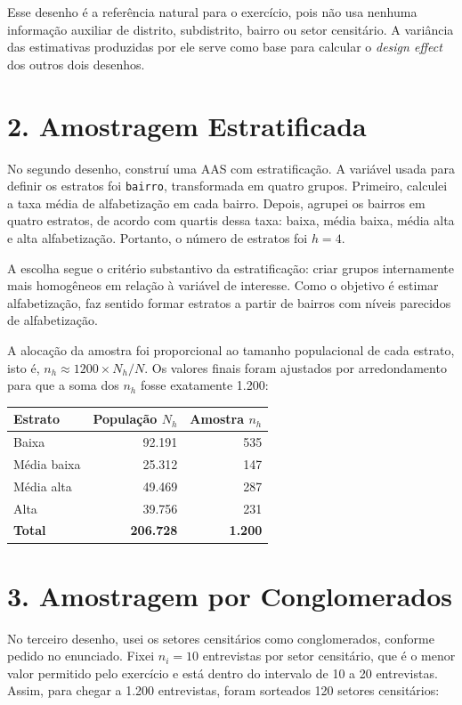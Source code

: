\documentclass[11pt,a4paper]{article}
\begin{document}
Esse desenho é a referência natural para o exercício, pois não usa nenhuma informação auxiliar de distrito, subdistrito, bairro ou setor censitário. A variância das estimativas produzidas por ele serve como base para calcular o \textit{design effect} dos outros dois desenhos.

\section*{2. Amostragem Estratificada}

No segundo desenho, construí uma AAS com estratificação. A variável usada para definir os estratos foi \texttt{bairro}, transformada em quatro grupos. Primeiro, calculei a taxa média de alfabetização em cada bairro. Depois, agrupei os bairros em quatro estratos, de acordo com quartis dessa taxa: baixa, média baixa, média alta e alta alfabetização. Portanto, o número de estratos foi \(h = 4\).

A escolha segue o critério substantivo da estratificação: criar grupos internamente mais homogêneos em relação à variável de interesse. Como o objetivo é estimar alfabetização, faz sentido formar estratos a partir de bairros com níveis parecidos de alfabetização.

A alocação da amostra foi proporcional ao tamanho populacional de cada estrato, isto é, \(n_h \approx 1200 \times N_h/N\). Os valores finais foram ajustados por arredondamento para que a soma dos \(n_h\) fosse exatamente 1.200:

\begin{center}
\begin{tabular}{lrr}
\toprule
\textbf{Estrato} & \textbf{População \(N_h\)} & \textbf{Amostra \(n_h\)} \\
\midrule
Baixa & 92.191 & 535 \\
Média baixa & 25.312 & 147 \\
Média alta & 49.469 & 287 \\
Alta & 39.756 & 231 \\
\midrule
\textbf{Total} & \textbf{206.728} & \textbf{1.200} \\
\bottomrule
\end{tabular}
\end{center}

\section*{3. Amostragem por Conglomerados}

No terceiro desenho, usei os setores censitários como conglomerados, conforme pedido no enunciado. Fixei \(n_i = 10\) entrevistas por setor censitário, que é o menor valor permitido pelo exercício e está dentro do intervalo de 10 a 20 entrevistas. Assim, para chegar a 1.200 entrevistas, foram sorteados 120 setores censitários:
\end{document}
